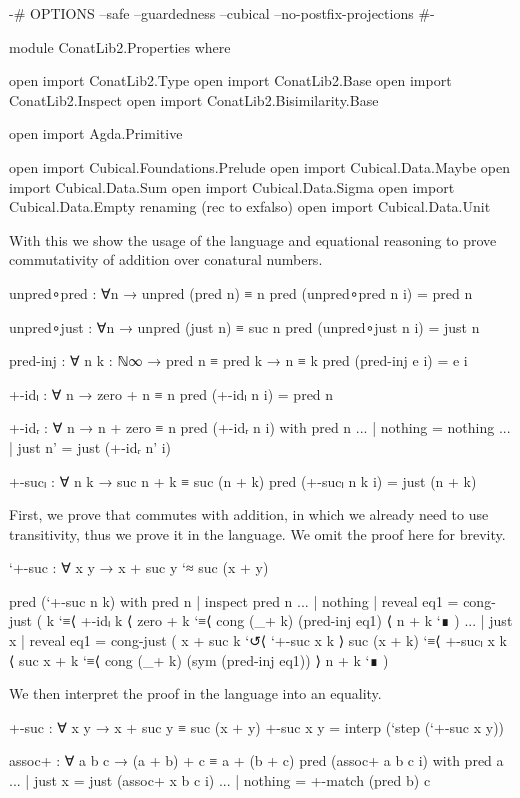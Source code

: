 \begin{code}[hide]
{-# OPTIONS --safe --guardedness --cubical --no-postfix-projections #-}

module ConatLib2.Properties where

open import ConatLib2.Type
open import ConatLib2.Base
open import ConatLib2.Inspect
open import ConatLib2.Bisimilarity.Base

open import Agda.Primitive

open import Cubical.Foundations.Prelude
open import Cubical.Data.Maybe
open import Cubical.Data.Sum
open import Cubical.Data.Sigma
open import Cubical.Data.Empty
  renaming (rec to exfalso)
open import Cubical.Data.Unit
\end{code}

With this we show the usage of the language and equational reasoning to prove
commutativity of addition over conatural numbers.
\begin{code}[hide]
unpred∘pred : ∀{n} → unpred (pred n) ≡ n
pred (unpred∘pred {n} i) = pred n

unpred∘just : ∀{n} → unpred (just n) ≡ suc n
pred (unpred∘just {n} i) = just n

pred-inj : ∀ {n k : ℕ∞} → pred n ≡ pred k → n ≡ k
pred (pred-inj e i) = e i

+-idₗ : ∀ n → zero + n ≡ n
pred (+-idₗ n i) = pred n

+-idᵣ : ∀ n → n + zero ≡ n
pred (+-idᵣ n i) with pred n
... | nothing = nothing
... | just n' = just (+-idᵣ n' i)

+-sucₗ : ∀ n k → suc n + k ≡ suc (n + k)
pred (+-sucₗ n k i) = just (n + k)
\end{code}

First, we prove that  commutes with addition, in which we
already need to use transitivity, thus we prove it in the language. We omit the
proof here for brevity.
\begin{code}
`+-suc : ∀ x y → x + suc y `≈ suc (x + y)
\end{code}
\begin{code}[hide]
pred (`+-suc n k) with pred n | inspect pred n
... | nothing | reveal eq1 = cong-just (
  k
    `≡⟨ +-idₗ k ⟨
  zero + k
    `≡⟨ cong (_+ k) (pred-inj eq1) ⟨
  n + k `∎
  )
... | just x  | reveal eq1 = cong-just (
  x + suc k
    `↺⟨ `+-suc x k ⟩
  suc (x + k)
    `≡⟨ +-sucₗ x k ⟨
  suc x + k
    `≡⟨ cong (_+ k) (sym (pred-inj eq1)) ⟩
  n + k `∎
  )
\end{code}
We then interpret the proof in the language into an equality.
\begin{code}
+-suc : ∀ x y → x + suc y ≡ suc (x + y)
+-suc x y = interp (`step (`+-suc x y))
\end{code}
\begin{code}[hide]
assoc+ : ∀ a b c → (a + b) + c ≡ a + (b + c)
pred (assoc+ a b c i) with pred a
... | just x = just (assoc+ x b c i)
... | nothing = +-match (pred b) c
\end{code}

